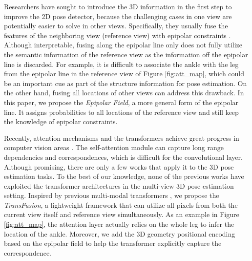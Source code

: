 \documentclass{bmvc2k}
\begin{document}
Researchers have sought to introduce the 3D information in the first step to improve the 2D pose detector, because the challenging cases in one view are potentially easier to solve in other views. Specifically, they usually fuse the features of the neighboring view (reference view) with epipolar constraints \cite{xie2020metafuse, zhang2021adafuse, he2020epipolar}. 
Although interpretable, fusing along the epipolar line only does not fully utilize the semantic information of the reference view as the information off the epipolar line is discarded. 
For example, it is difficult to associate the ankle with the leg from the epipolar line in the reference view of Figure \ref{fig:att_map}, which could be an important cue as part of the structure information for pose estimation. 
On the other hand, fusing all locations of other views can address this drawback. In this paper, we propose the  \textit{Epipolar Field}, a more general form of the epipolar line. It assigns probabilities to all locations of the reference view and still keep the knowledge of epipolar constraints.


Recently, attention mechanisms and the transformers \cite{vaswani2017attention} achieve great progress in computer vision areas \cite{wang2018non, dosovitskiy2020image, carion2020end, zhu2020deformable, zheng2020rethinking, lin2020end, tang2021spatial, wang2022sscap}.
The self-attention module \cite{vaswani2017attention} can capture long range dependencies and correspondences, which is difficult for the convolutional layer. Although promising, there are only a few works \cite{lin2020end} that apply it to the 3D pose estimation tasks. To the best of our knowledge, none of the previous works have exploited the transformer architectures in the multi-view 3D pose estimation setting. Inspired by previous multi-modal transformers \cite{su2019vl, tan2019lxmert, kim2021vilt}, we propose the \textit{TransFusion}, a lightweight framework that can utilize all pixels from both the current view itself and reference view simultaneously. As an example in Figure \ref{fig:att_map}, the attention layer actually relies on the whole leg to infer the location of the ankle. Moreover, we add the 3D geometry positional encoding based on the epipolar field to help the transformer explicitly capture the correspondence. 
\end{document}
